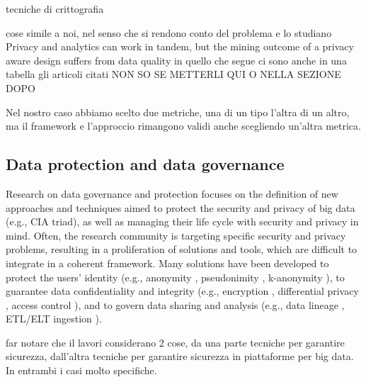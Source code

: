 tecniche di crittografia


cose simile a noi, nel senso che si rendono conto del problema e lo studiano
Privacy and analytics can work in tandem, but the mining outcome of a privacy aware design suffers from data quality
 in quello che segue ci sono anche in una tabella gli articoli citati
 NON SO SE METTERLI QUI O NELLA SEZIONE DOPO
 \cite{dataProtection}
 
Nel nostro caso abbiamo scelto due metriche, una di un tipo l'altra di un altro, ma il framework e l'approccio rimangono validi anche scegliendo un'altra metrica.

\subsection{Data protection and data governance}\label{ssec:datagov}

Research on data governance and protection focuses on the definition of new approaches and techniques aimed to protect the security and privacy of big data (e.g., CIA triad), as well as managing their life cycle with security and privacy in mind. Often, the research community is targeting specific security and privacy problems, resulting in a proliferation of solutions and tools, which are difficult to integrate in a coherent framework. Many solutions have been developed to protect the users' identity (e.g., anonymity \cite{wallace1999anonymity}, pseudonimity \cite{pfitzmann2001pseudonymity}, k-anonymity \cite{k-anon}), to guarantee data confidentiality and integrity (e.g., encryption \cite{thambiraja2012survey}, differential privacy \cite{hassan2019differential}, access control \cite{tolone2005access,servos2017current}), and to govern data sharing and analysis (e.g., data lineage \cite{woodruff1997supporting}, ETL/ELT ingestion \cite{vassiliadis2009survey}).


far notare che il lavori considerano 2 cose, da una parte tecniche per garantire sicurezza, dall'altra tecniche per garantire sicurezza in piattaforme per big data. In entrambi i casi molto specifiche.

